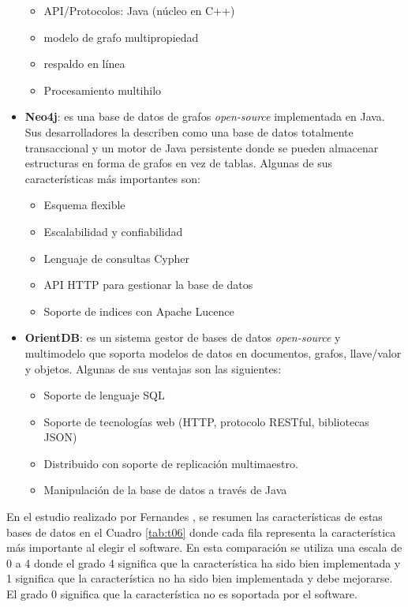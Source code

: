 \documentclass[11pt,letterpaper,oneside]{article}
\begin{document}
\begin{itemize}
\begin{itemize}
			\item API/Protocolos: Java (núcleo en C++)
			\item modelo de grafo multipropiedad
			\item respaldo en línea
			\item Procesamiento multihilo
		\end{itemize}
		\item \textbf{Neo4j}: es una base de datos de grafos {\em open-source} implementada en Java. Sus desarrolladores la describen como una base de datos totalmente transaccional y un motor de Java persistente donde se pueden almacenar estructuras en forma de grafos en vez de tablas. Algunas de sus características más importantes son:
		\begin{itemize}
			\item Esquema flexible
			\item Escalabilidad y confiabilidad
			\item Lenguaje de consultas Cypher
			\item API HTTP para gestionar la base de datos
			\item Soporte de indices con Apache Lucence
		\end{itemize}
		\item \textbf{OrientDB}: es un sistema gestor de bases de datos {\em open-source} y multimodelo que soporta modelos de datos en documentos, grafos, llave/valor y objetos. Algunas de sus ventajas son las siguientes:
		\begin{itemize}
			\item Soporte de lenguaje SQL
			\item Soporte de tecnologías web (HTTP, protocolo RESTful, bibliotecas JSON)
			\item Distribuido con soporte de replicación multimaestro.
			\item Manipulación de la base de datos a través de Java
		\end{itemize}
	\end{itemize}
	
	En el estudio realizado por Fernandes \cite{Fernandes-2018}, se resumen las características de estas bases de datos en el Cuadro \ref{tab:t06} donde cada fila representa la característica más importante al elegir el software. En esta comparación se utiliza una escala de 0 a 4 donde el grado 4 significa que la característica ha sido bien implementada y 1 significa que la característica no ha sido bien implementada y debe mejorarse. El grado 0 significa que la característica no es soportada por el software.
	
\end{document}
